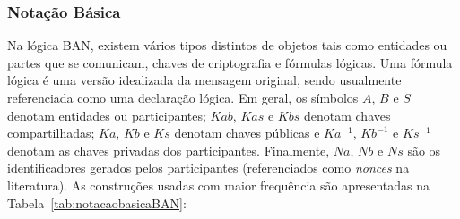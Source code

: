 \subsubsection{Notação Básica}

Na lógica BAN, existem vários tipos distintos de objetos tais como entidades ou partes que se comunicam, chaves de criptografia e fórmulas lógicas. Uma fórmula lógica é uma versão idealizada da mensagem original, sendo usualmente referenciada como uma declaração lógica. Em geral, os símbolos $A$, $B$ e $S$ denotam entidades ou participantes; $Kab$, $Kas$ e $Kbs$ denotam chaves compartilhadas; $Ka$, $Kb$ e $Ks$ denotam chaves públicas e $Ka^{-1}$, $Kb^{-1}$ e $Ks^{-1}$ denotam as chaves privadas dos participantes.
Finalmente, $Na$, $Nb$ e $Ns$ são os identificadores gerados pelos participantes (referenciados como \emph{nonces}
na literatura). As construções usadas com maior frequência são apresentadas na Tabela~\ref{tab:notacaobasicaBAN}:

\newcommand{\RHQuery}{\textbf{[???]}}
\newcommand{\RHRemark}[1]{\textbf{[#1]}}
\newcommand{\Believess}[2]{{#1}\mathrel{\textbf{\mid\equiv}}{#2}}
\newcommand{\Seess}[2]{{#1}\mathrel{\textbf{\triangleleft}}{#2}}
\newcommand{\Saids}[2]{{#1}\mathrel{\textbf{\mid\sim}}{#2}}

\newcommand{\Believes}[2]{{#1}\mathrel{\textbf{acredita}}{#2}}
\newcommand{\Sees}[2]{{#1}\mathrel{\textbf{recebeu}}{#2}}
\newcommand{\Said}[2]{{#1}\mathrel{\textbf{disse}}{#2}}
\newcommand{\Controls}[2]{{#1}\mathrel{\textbf{controla}}{#2}}
\newcommand{\Fresh}[1]{{#1}\,\textbf{novo}}
\newcommand{\Share}[3]{{#1}\stackrel{#2}{\longleftrightarrow}{#3}}
\newcommand{\ShareSecret}[3]{{#1}\stackrel{#2}{\rightleftharpoons}{#3}}
\newcommand{\PubKey}[2]{{}\stackrel{#1}{\mapsto}{#2}}
\newcommand{\Secret}[3]{{#1}\stackrel{#2}{\leftrightharpoons}{#3}}
\newcommand{\Encrypt}[2]{\{\,{#1}\,\}_{#2}}
\newcommand{\EncryptFrom}[3]{\{\,{#1}\,\}_{#2}^{#3}}
\newcommand{\Attach}[2]{\langle {#1}\rangle_{#2}}

